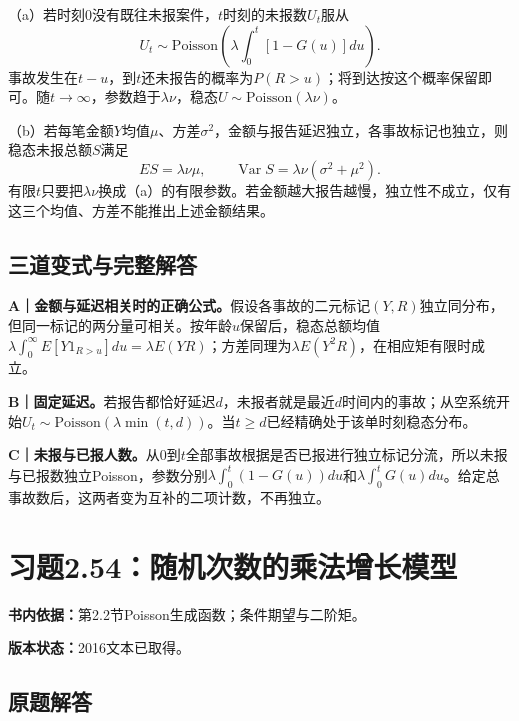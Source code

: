 \documentclass[
  11pt,
  a4paper,
  UTF8,fontset=fandol]{ctexart}
\let\OldSection\section
\renewcommand{\section}{\Needspace{7\baselineskip}\OldSection}
\let\OldSubsection\subsection
\renewcommand{\subsection}{\Needspace{5\baselineskip}\OldSubsection}
\begin{document}
（a）若时刻0没有既往未报案件，\(t\)时刻的未报数\(U_t\)服从
\[\boxed{U_t\sim\mathrm{Poisson}\left(\lambda\int_0^t[1-G(u)]du\right).}\]
事故发生在\(t-u\)，到\(t\)还未报告的概率为\(P(R>u)\)；将到达按这个概率保留即可。随\(t\to\infty\)，参数趋于\(\lambda\nu\)，稳态\(\boxed{U\sim\mathrm{Poisson}(\lambda\nu)}\)。

（b）若每笔金额\(Y\)均值\(\mu\)、方差\(\sigma^2\)，金额与报告延迟独立，各事故标记也独立，则稳态未报总额\(S\)满足
\[\boxed{ES=\lambda\nu\mu,\qquad\operatorname{Var}S=\lambda\nu(\sigma^2+\mu^2).}\]
有限\(t\)只要把\(\lambda\nu\)换成（a）的有限参数。若金额越大报告越慢，独立性不成立，仅有这三个均值、方差不能推出上述金额结果。

\subsection{三道变式与完整解答}\label{ux4e09ux9053ux53d8ux5f0fux4e0eux5b8cux6574ux89e3ux7b54-52}

\textbf{A｜金额与延迟相关时的正确公式。}假设各事故的二元标记\((Y,R)\)独立同分布，但同一标记的两分量可相关。按年龄\(u\)保留后，稳态总额均值\(\lambda\int_0^\infty E[Y1_{R>u}]du=\lambda E(YR)\)；方差同理为\(\lambda E(Y^2R)\)，在相应矩有限时成立。

\textbf{B｜固定延迟。}若报告都恰好延迟\(d\)，未报者就是最近\(d\)时间内的事故；从空系统开始\(U_t\sim\mathrm{Poisson}(\lambda\min(t,d))\)。当\(t\ge d\)已经精确处于该单时刻稳态分布。

\textbf{C｜未报与已报人数。}从0到\(t\)全部事故根据是否已报进行独立标记分流，所以未报与已报数独立Poisson，参数分别\(\lambda\int_0^t(1-G(u))du\)和\(\lambda\int_0^tG(u)du\)。给定总事故数后，这两者变为互补的二项计数，不再独立。

\newpage

\section{习题2.54：随机次数的乘法增长模型}\label{ux4e60ux98982.54ux968fux673aux6b21ux6570ux7684ux4e58ux6cd5ux589eux957fux6a21ux578b}

\textbf{书内依据：}第2.2节Poisson生成函数；条件期望与二阶矩。

\textbf{版本状态：}2016文本已取得。

\subsection{原题解答}\label{ux539fux9898ux89e3ux7b54-53}
\end{document}
